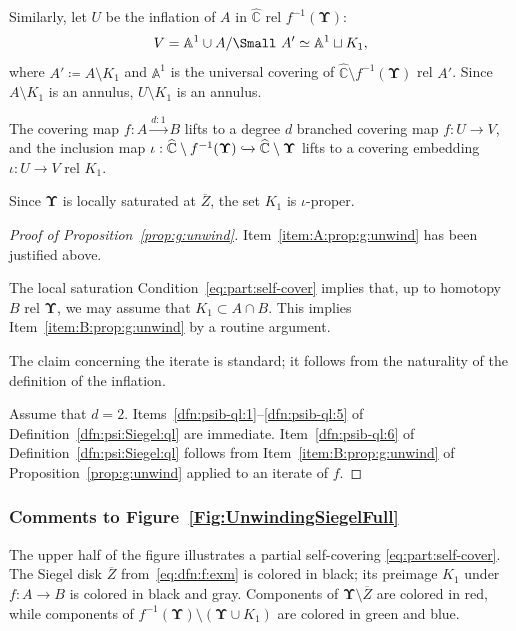 \documentclass{amsart}
\newcommand{\1}{{\mathbb 1 }}
\newcommand{\bUpsilon}{{\mathbf \Upsilon}}
\newcommand{\wC}{\widehat{\mathbb{C}}}
\theoremstyle{remark}
\numberwithin{equation}{section}
\theoremstyle{definition}
\begin{document}
Similarly, let $U$ be the inflation of $A$ in $\wC$ rel $f^{-1}(\bUpsilon)$:
$$
V = \mathbb{A}^1 \cup A/\text{\Small $A'$} \simeq \mathbb{A}^1 \sqcup K_1,
$$
where $A'\coloneqq A\setminus K_1$ and $\mathbb{A}^1$ is the universal covering of $\wC\setminus f^{-1}(\bUpsilon)$ rel $A'$. Since $A\setminus K_1$ is an annulus, $U\setminus K_1$ is an annulus.

The covering map $f\colon A \overset{d:1}{\longrightarrow} B$ lifts to a degree $d$ branched covering map $f: U \longrightarrow V$, and the inclusion map $\iota:\wC \setminus f^{-1}(\bUpsilon) \xhookrightarrow{} \wC \setminus \bUpsilon$ lifts to a covering embedding $\iota: U \longrightarrow V$ rel $K_1$. 


Since $\bUpsilon$ is locally saturated at $\overline Z$, the set $K_1$ is $\iota$-proper. 


\begin{proof}[Proof of Proposition~\ref{prop:g:unwind}] 
Item~\ref{item:A:prop:g:unwind} has been justified above. 

The local saturation Condition~\ref{eq:part:self-cover} implies that, up to homotopy $B$ rel $\bUpsilon$, we may assume that $K_1\subset A\cap B$. This implies Item~\ref{item:B:prop:g:unwind} by a routine argument. 

The claim concerning the iterate is standard; it follows from the naturality of the definition of the inflation.
 
Assume that $d=2$. Items~\ref{dfn:psib-ql:1}--\ref{dfn:psib-ql:5} of Definition~\ref{dfn:psi:Siegel:ql} are immediate. Item~\ref{dfn:psib-ql:6} of Definition~\ref{dfn:psi:Siegel:ql}  follows from Item~\ref{item:B:prop:g:unwind} of Proposition~\ref{prop:g:unwind} applied to an iterate of $f$.
\end{proof}



\subsubsection{Comments to Figure~\ref{Fig:UnwindingSiegelFull}}\label{sss:Fig:UnwindingSiegelFull} 

The upper half of the figure illustrates a partial self-covering \eqref{eq:part:self-cover}. The Siegel disk $\overline Z$ from~\eqref{eq:dfn:f:exm} is colored in black; its preimage $K_1$ under $f\colon A\to B$ is colored in black and gray. Components of $\bUpsilon\setminus \overline Z$ are colored in red, while components of $f^{-1}(\bUpsilon)\setminus (\bUpsilon\cup K_1)$ are colored in green and blue.
\end{document}

